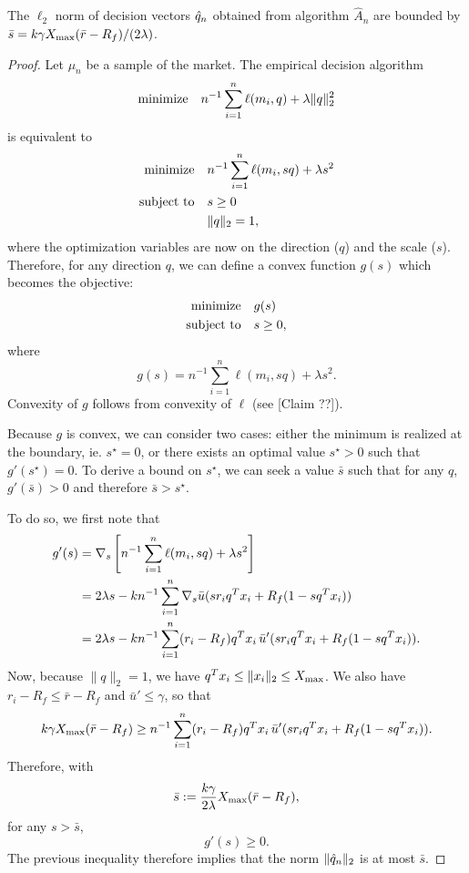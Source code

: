 \begin{claim}
  \label{claim_q_bound}
  The $\ell_2$ norm of decision vectors ${\hat q}_n$ obtained from algorithm $\hat A_n$ are
  bounded by $\bar s = k\gamma X_{\max}(\bar r-R_f)/(2\lambda)$.
\end{claim}
\begin{proof}
  Let $\mu_n$ be a sample of the market. The empirical decision algorithm 
  \begin{equation*}
    \text{minimize} \quad {n^{-1}\sum_{i=1}^n\ell(m_i,q) + \lambda\|q\|^2_2}
  \end{equation*}
  is equivalent to 
  \begin{align*}
    \minimizeEquationSt{n^{-1}\sum_{i=1}^n \ell(m_i,sq) + \lambda s^2}[s\geq0\\,\|q\|_2=1],
  \end{align*}
  where the optimization variables are now on the direction ($q$) and the scale
  ($s$). Therefore, for any direction $q$, we can define a convex function $g(s)$ which
  becomes the objective:
  \begin{align*}
    \minimizeEquationSt{g(s)}[s\geq 0],
  \end{align*}
  where
  \begin{equation*}
    g(s) = n^{-1}\sum_{i=1}^n \ell(m_i, sq) + \lambda s^2.
  \end{equation*}
  Convexity of $g$ follows from convexity of $\ell$ (see [Claim ??]).

  
  Because $g$ is convex, we can consider two cases: either the minimum is realized at the
  boundary, ie. $s^\star=0$, or there exists an optimal value $s^\star > 0$ such that
  $g'(s^\star)=0$. To derive a bound on $s^\star$, we can seek a value $\bar s$ such
  that for any $q$, $g'(\bar s)>0$ and therefore $\bar s > s^\star$.

  To do so, we first note that 
  \begin{align*}
    g'(s) &= \nabla_s \left[n^{-1}\sum_{i=1}^n\ell(m_i,sq) + \lambda s^2\right]\\
          &= 2\lambda s - kn^{-1}\sum_{i=1}^n \nabla_s \bar u(sr_iq^Tx_i+R_f(1-sq^Tx_i))\\
          &= 2\lambda s - kn^{-1}\sum_{i=1}^n (r_i-R_f)q^Tx_i \, \bar u'(sr_iq^Tx_i+R_f(1-sq^Tx_i)).
  \end{align*}
  Now, because $\|q\|_2=1$, we have $q^Tx_i\leq\|x_i\|_2\leq X_{\max}$. We also have
  $r_i-R_f\leq \bar r-R_f$ and $\bar u'\leq\gamma$, so that
  \begin{equation*}
    k\gamma X_{\max}(\bar r-R_f) \geq n^{-1}\sum_{i=1}^n (r_i-R_f)q^Tx_i \, \bar u'(sr_iq^Tx_i+R_f(1-sq^Tx_i)).
  \end{equation*}
  Therefore, with
  \begin{equation*}
    \bar s := \frac{k\gamma}{2\lambda}X_{\max}(\bar r-R_f),
  \end{equation*}
  for any $s>\bar s$,
  \begin{equation*}
    g'(s) \geq 0.
  \end{equation*}
  The previous inequality therefore implies that the norm $\|{\hat q}_n\|_2$ is at most $\bar
  s$. 
\end{proof}

